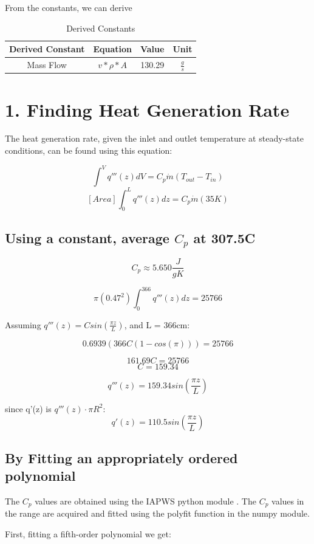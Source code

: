 \documentclass[12pt,letterpaper]{article}
\begin{document}
From the constants, we can derive
\begin{table}[h]
     \centering
    \begin{tabular}{cccc}
    \hline
       Derived Constant & Equation & Value & Unit \\
    \hline
       Mass Flow & $ v * \rho * A $ & 130.29 & $\frac{g}{s}$ \\
    \hline
    \end{tabular}
    \caption {Derived Constants}
    \label{tab:der_constants}
\end{table}



\section* {1. Finding Heat Generation Rate}

The heat generation rate, given the inlet and outlet temperature
at steady-state conditions, can be found using this equation:

\[\int^{V} q'''(z) dV = C_p \dot{m} (T_{out} - T_{in})\]
\[[Area] \int^{L}_{0} q'''(z) dz = C_p \dot{m} (35 K)\]

\subsection*{Using a constant, average $C_p$ at 307.5C}
\[C_p \approx 5.650 \frac{J}{g K}\]

\[ \pi (0.47^2)  \int^{366}_{0} q'''(z) dz = 25766\]

Assuming $q'''(z) = C sin(\frac{\pi z}{L})$,
and L = 366cm:

\[ 0.6939 (366C(1-cos(\pi))) = 25766\]

\[161.69C = 25766\]
\[C = 159.34 \]

\[q'''(z) = 159.34 sin(\frac{\pi z}{L})\]

since q'(z) is $q'''(z) \cdot \pi R^2$:
\[q'(z) = 110.5 sin(\frac{\pi z}{L})\]

\subsection*{By Fitting an appropriately ordered polynomial}

The $C_p$ values are obtained using the IAPWS python
module \cite{romera_iapws:_2017}. The $C_p$ values
in the range are acquired and fitted using
the polyfit function in the numpy module.

First, fitting a fifth-order polynomial we get:
\end{document}
